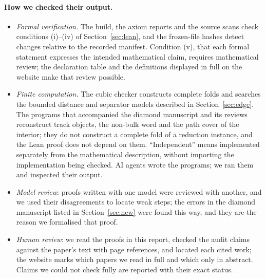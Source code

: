 \documentclass[11pt,letterpaper]{article}
\theoremstyle{definition}
\theoremstyle{remark}
\begin{document}
\paragraph{How we checked their output.}
\begin{itemize}
  \item \emph{Formal verification.} The build, the axiom reports and the source scans check
    conditions (i)--(iv) of Section~\ref{sec:lean}, and the frozen-file hashes detect changes
    relative to the recorded manifest. Condition (v), that each formal statement expresses the
    intended mathematical claim, requires mathematical review; the declaration table and the
    definitions displayed in full on the website make that review possible.
  \item \emph{Finite computation.} The cubic checker constructs complete folds and searches the
    bounded distance and separator models described in Section~\ref{sec:edge}. The programs that
    accompanied the diamond manuscript and its reviews reconstruct track objects, the non-bulk word
    and the path cover of the interior; they do not construct a complete fold of a reduction
    instance, and the Lean proof does not depend on them. ``Independent'' means implemented separately from the
    mathematical description, without importing the implementation being checked. AI agents wrote
    the programs; we ran them and inspected their output.
  \item \emph{Model review}: proofs written with one model were reviewed with another, and we used
    their disagreements to locate weak steps; the errors in the diamond manuscript listed in
    Section~\ref{sec:new} were found this way, and they are the reason we formalised that proof.
  \item \emph{Human review}: we read the proofs in this report, checked the audit claims against the
    paper's text with page references, and located each cited work; the website marks which papers
    we read in full and which only in abstract. Claims we could not check fully are reported with
    their exact status.
\end{itemize}
\end{document}
